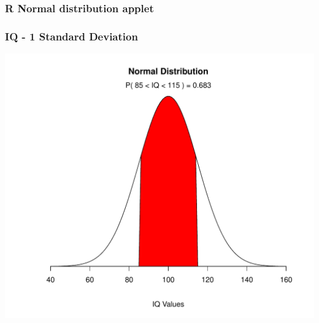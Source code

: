 \documentclass[dvipsnames]{beamer}\usepackage[]{graphicx}\usepackage[]{color}
\makeatletter
\def\maxwidth{ %
  \ifdim\Gin@nat@width>\linewidth
    \linewidth
  \else
    \Gin@nat@width
  \fi
}
\newenvironment{knitrout}{}{} %
\makeatother
\begin{document}
\begin{frame}
\frametitle{R Normal distribution applet}
\end{frame}

\begin{frame}
\frametitle{IQ - 1 Standard Deviation}
\begin{knitrout}
\color{fgcolor}

{\centering \includegraphics[width=\maxwidth]{figure/unnamed-chunk-10-1} 

}



\end{knitrout}
\end{frame}
\end{document}
